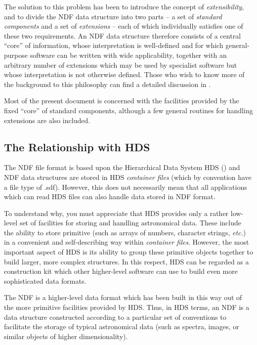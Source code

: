 \documentclass[twoside,11pt,nolof]{starlink}
\providecommand{\st}[1]{{\emph{#1}}}
\begin{document}
The solution to this problem has been to introduce the concept of
\st{extensibility}, and to divide the NDF data structure into two
parts -- a set
of \st{standard components\/} and a set of \st{extensions\/} -- each of which
individually satisfies one of these two requirements.
An NDF data structure therefore consists of a central ``core'' of
information, whose interpretation is well-defined and for which
general-purpose software can be written with wide applicability, together
with an arbitrary number of extensions which may be used by specialist
software but whose interpretation is not otherwise defined.
Those who wish to know more of the background to this philosophy can find a
detailed discussion in .

Most of the present document is concerned with the facilities provided by
the fixed ``core'' of standard components, although a few general routines
for handling extensions are also included.

\subsection{The Relationship with HDS}

The NDF file format is based upon the Hierarchical Data System HDS
() and NDF data structures are stored in HDS
\st{container files\/} (which by convention have a file type of
.sdf).  However, this does not necessarily mean that all applications
which can read HDS files can also handle data stored in NDF format.

To understand why, you must appreciate that HDS provides only a rather
low-level set of facilities for storing and handling astronomical data.
These include the ability to store primitive  (such as arrays of numbers, character
strings, \st{etc.}) in a convenient and self-describing way within
\st{container files}.
However, the most important aspect of HDS is its ability to group these
primitive objects together to build larger, more complex structures.
In this respect, HDS can be regarded as a construction kit which other
higher-level software can use to build even more sophisticated data formats.

The NDF is a higher-level data format which has been built in this way out
of the more primitive facilities provided by HDS.
Thus, in HDS terms, an NDF is a data structure constructed according to a
particular set of conventions to facilitate the storage of typical
astronomical data (such as spectra, images, or similar objects of higher
dimensionality).
\end{document}
